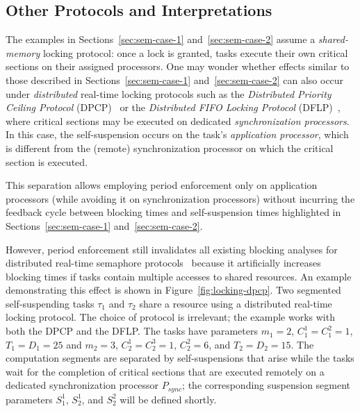 \subsection{Other Protocols and Interpretations}

The examples in Sections~\ref{sec:sem-case-1} and~\ref{sec:sem-case-2} assume a \emph{shared-memory} locking protocol: once a lock is granted, tasks execute their own critical sections on their assigned processors. One may wonder whether  effects similar to those described in Sections~\ref{sec:sem-case-1} and~\ref{sec:sem-case-2} can also occur under \emph{distributed} real-time locking protocols such as the \emph{Distributed Priority Ceiling Protocol} (DPCP)~\cite{RSL:88,Raj:91} or the \emph{Distributed FIFO Locking Protocol} (DFLP)~\cite{Br:13,Br:14}, where critical sections may be executed on dedicated \emph{synchronization processors}. In this case, the self-suspension occurs on the task's \emph{application processor}, which is different from the (remote) synchronization processor on which the critical section is executed.

This separation allows employing period enforcement  only on application processors (while avoiding it on synchronization processors) without incurring the feedback cycle between blocking times and self-suspension times highlighted in Sections~\ref{sec:sem-case-1} and~\ref{sec:sem-case-2}.

However, period enforcement still invalidates all existing blocking analyses for distributed real-time semaphore protocols~\cite{RSL:88,Raj:91,Br:13} because it artificially increases blocking times if tasks contain multiple accesses to shared resources. An example demonstrating this effect is shown in Figure~\ref{fig:locking-dpcp}. Two segmented self-suspending tasks $\tau_1$ and $\tau_2$ share a resource using a distributed real-time locking protocol. The choice of protocol is irrelevant; the example works with both the DPCP and the DFLP. The tasks have parameters $m_1 = 2$, $C_1^1 = C_1^2 = 1$, $T_1 = D_1 = 25$ and $m_2 = 3$, $C_2^1 = C_2^3 = 1$, $C^2_2 = 6$, and $T_2 = D_2 = 15$. The computation segments are separated by self-suspensions that arise while the tasks wait for the completion of critical sections that are executed remotely on a dedicated synchronization processor $P_{sync}$; the corresponding suspension segment parameters $S_1^1$, $S_2^1$, and $S_2^2$ will be defined shortly.

